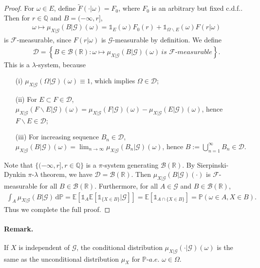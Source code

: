 \documentclass{article}
\numberwithin{equation}{section}
\newcommand{\E}{\mathbb{E}}
\renewcommand{\P}{\mathbb{P}}
\renewcommand{\d}{\mathrm{d}}
\theoremstyle{plain}
\theoremstyle{definition}
\begin{document}
\begin{proof}
For $\omega\in E$, define $\widetilde{F}(\cdot|\omega)=F_0$, where $F_0$ is an arbitrary but fixed c.d.f.. Then for $r\in\mathbb{Q}$ and $B=(-\infty,r]$,
\begin{align*}
	\omega\mapsto \mu_{X|\mathscr{G}}(B|\mathscr{G})(\omega) = \mathds{1}_E(\omega)F_0(r) + \mathds{1}_{\Omega\backslash E}(\omega)F(r|\omega)
\end{align*}
is $\mathscr{F}$-measurable, since $F(r|\omega)$ is $\mathscr{G}$-measurable by definition. We define
\begin{align*}
	\mathscr{D}=\left\{B\in\mathscr{B}(\mathbb{R}):\omega\mapsto\mu_{X|\mathscr{G}}(B|\mathscr{G})(\omega)\ \textit{is $\mathscr{F}$-measurable}\right\}.
\end{align*}
This is a $\lambda$-system, because
\begin{itemize}
	\item[(i)] $\mu_{X|\mathscr{G}}(\Omega|\mathscr{G})(\omega)\equiv 1$, which implies $\Omega\in\mathscr{D}$;
	\item[(ii)] For $E\subset F\in\mathscr{D}$, $\mu_{X|\mathscr{G}}(F\backslash E|\mathscr{G})(\omega) = \mu_{X|\mathscr{G}}(F|\mathscr{G})(\omega) - \mu_{X|\mathscr{G}}(E|\mathscr{G})(\omega)$, hence $F\backslash E\in\mathscr{D}$;
	\item[(iii)] For increasing sequence $B_n\in\mathscr{D}$, $\mu_{X|\mathscr{G}}(B|\mathscr{G})(\omega) = \lim_{n\to\infty}\mu_{X|\mathscr{G}}(B_n|\mathscr{G})(\omega)$, hence $B:=\bigcup_{n=1}^\infty B_n\in\mathscr{D}$.
\end{itemize}

Note that $\{(-\infty,r],r\in\mathbb{Q}\}$ is a $\pi$-system generating $\mathscr{B}(\mathbb{R})$. By Sierpinski-Dynkin $\pi$-$\lambda$ theorem, we have $\mathscr{D}=\mathscr{B}(\mathbb{R})$. Then $\mu_{X|\mathscr{G}}(B|\mathscr{G})(\cdot)$ is $\mathscr{F}$-measurable for all $B\in\mathscr{B}(\mathbb{R})$. Furthermore, for all $A\in\mathscr{G}$ and $B\in\mathscr{B}(\mathbb{R})$,
\begin{align*}
	\int_A\mu_{X|\mathscr{G}}(B|\mathscr{G})\,\d \P = \E\left[\mathds{1}_A\E[\mathds{1}_{\{X\in B\}}|\mathscr{G}]\right]=\E[\mathds{1}_{A\cap\{X\in B\}}] = \P(\omega\in A, X\in B).
\end{align*}
Thus we complete the full proof.
\end{proof}
\paragraph{Remark.} If $X$ is independent of $\mathscr{G}$, the conditional distribution $\mu_{X|\mathscr{G}}(\cdot|\mathscr{G})(\omega)$ is the same as the unconditional distribution $\mu_X$ for $\P\textit{-a.e.}$ $\omega\in\Omega$.
\end{document}
